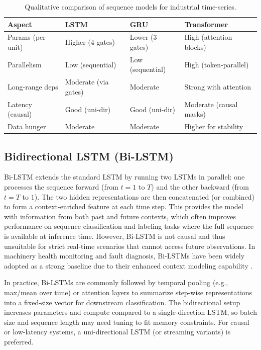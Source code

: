 \begin{table}[t]
\centering
\caption{Qualitative comparison of sequence models for industrial time-series.}
\label{tab:model_compare}
\begin{tabular}{l l l l}
\hline
Aspect & LSTM & GRU & Transformer \\
\hline
Params (per unit) & Higher (4 gates) & Lower (3 gates) & High (attention blocks) \\
Parallelism & Low (sequential) & Low (sequential) & High (token-parallel) \\
Long-range deps & Moderate (via gates) & Moderate & Strong with attention \\
Latency (causal) & Good (uni-dir) & Good (uni-dir) & Moderate (causal masks) \\
Data hunger & Moderate & Moderate & Higher for stability \\
\hline
\end{tabular}
\end{table}

\subsection{Bidirectional LSTM (Bi-LSTM)}
Bi-LSTM extends the standard LSTM by running two LSTMs in parallel: one processes the sequence forward (from \(t=1\) to \(T\)) and the other backward (from \(t=T\) to \(1\)). The two hidden representations are then concatenated (or combined) to form a context-enriched feature at each time step. This provides the model with information from both past and future contexts, which often improves performance on sequence classification and labeling tasks where the full sequence is available at inference time. However, Bi-LSTM is not causal and thus unsuitable for strict real-time scenarios that cannot access future observations. In machinery health monitoring and fault diagnosis, Bi-LSTMs have been widely adopted as a strong baseline due to their enhanced context modeling capability \cite{zhang2019deep, zhao2019deep}.

In practice, Bi-LSTMs are commonly followed by temporal pooling (e.g., max/mean over time) or attention layers to summarize step-wise representations into a fixed-size vector for downstream classification. The bidirectional setup increases parameters and compute compared to a single-direction LSTM, so batch size and sequence length may need tuning to fit memory constraints. For causal or low-latency systems, a uni-directional LSTM (or streaming variants) is preferred.

